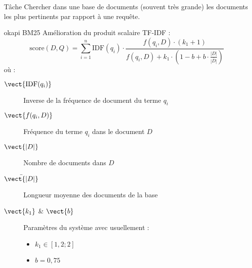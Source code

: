 \begin{frame}{Tâche}
  Chercher dans une base de documents (souvent très grande) les documents les plus pertinents par rapport à une requête.
\end{frame}

\begin{frame}{okapi BM25}
  Amélioration du produit scalaire TF-IDF :
  \[
  \text{score}(D, Q)
  = \sum _{i = 1}^n
  \text{IDF}(q_i)
  \cdot
  \frac{f(q_i, D) \cdot (k_1 + 1)}%
       {f(q_i, D) + k_1 \cdot \left(1 - b + b \cdot \frac{|D|}{\bar{|D|}}\right)}
  \]
  où :
  \begin{description}
  \item[$\vect{\text{IDF}(q_i)}$] Inverse de la fréquence de document du terme $q_i$
  \item[$\vect{f(q_i, D)}$] Fréquence du terme $q_i$ dans le document $D$
  \item[$\vect{|D|}$] Nombre de documents dans $D$
  \item[$\bar{\vect{|D|}}$] Longueur moyenne des documents de la base
  \item[$\vect{k_1}$ \& $\vect{b}$] Paramètres du système avec usuellement :
  \begin{itemize}
    \item $k_1 \in [1,2;2]$
    \item $b = 0,75$
  \end{itemize}
  \end{description}
\end{frame}
